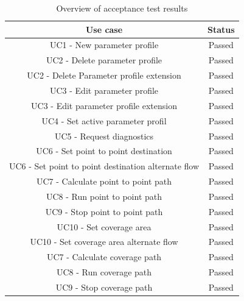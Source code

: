 \begin{table}[H]
\centering
\begin{tabular}{|c|c|}
\hline 
\textbf{Use case} & \textbf{Status}\\ 
\hline 
UC1 - New parameter profile & Passed \\ 
\hline 
UC2 - Delete parameter profile & Passed \\ 
\hline 
UC2 - Delete Parameter profile extension & Passed \\ 
\hline 
UC3 - Edit parameter profile & Passed \\ 
\hline 
UC3 - Edit parameter profile extension & Passed \\ 
\hline 
UC4 - Set active parameter profil & Passed \\ 
\hline 
UC5 - Request diagnostics & Passed \\ 
\hline 
UC6 - Set point to point destination & Passed \\ 
\hline 
UC6 - Set point to point destination alternate flow & Passed \\ 
\hline 
UC7 - Calculate point to point path & Passed \\ 
\hline 
UC8 - Run point to point path & Passed \\ 
\hline 
UC9 - Stop point to point path & Passed \\ 
\hline 
UC10 - Set coverage area & Passed \\ 
\hline 
UC10 - Set coverage area alternate flow & Passed \\ 
\hline 
UC7 - Calculate coverage path & Passed \\ 
\hline 
UC8 - Run coverage path & Passed \\ 
\hline 
UC9 - Stop coverage path & Passed \\ 
\hline 
\end{tabular} 
\caption{Overview of acceptance test results}
\label{table:acceptance_test_results}
\end{table}